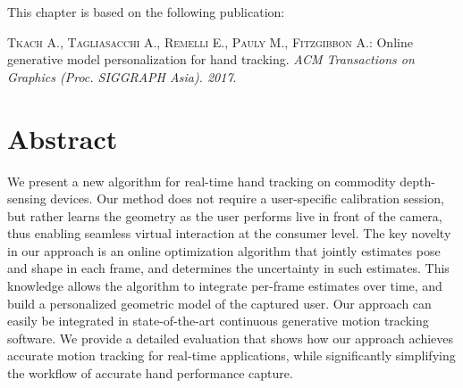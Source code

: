 This chapter is based on the following publication:

\begin{adjustwidth}{2.5em}{0pt}
\textsc{Tkach A., Tagliasacchi A., Remelli E., Pauly M., Fitzgibbon A.}: Online generative model personalization for hand tracking. \textit{ACM Transactions on Graphics (Proc. SIGGRAPH Asia). 2017}.
\end{adjustwidth}

\section*{Abstract}
% 
We present a new algorithm for real-time hand tracking on commodity depth-sensing devices. Our method does not require a user-specific calibration session, but rather learns the geometry as the user performs live in front of the camera, thus enabling seamless virtual interaction at the consumer level.
The key novelty in our approach is an online optimization algorithm that jointly estimates pose and shape in each frame, and determines the uncertainty in such estimates. This knowledge allows the algorithm to integrate per-frame estimates over time, and build a personalized geometric model of the captured user.
Our approach can easily be integrated in state-of-the-art continuous generative motion tracking software. 
We provide a detailed evaluation that shows how our approach achieves accurate motion tracking for real-time applications, while significantly simplifying the workflow of accurate hand performance capture.
% 
